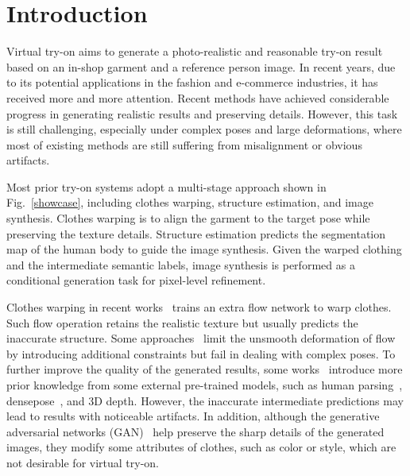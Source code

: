 \documentclass[runningheads]{llncs}
\begin{document}
\section{Introduction}

Virtual try-on aims to generate a photo-realistic and reasonable try-on result based on an in-shop garment and a reference person image. In recent years, due to its potential applications in the fashion and e-commerce industries, it has received more and more attention. Recent methods \cite{ge2021parser,AGCPN,vitonhd,ge2021disentangled,zflow} have achieved considerable progress in generating realistic results and preserving details. However, this task is still challenging, especially under complex poses and large deformations, where most of existing methods are still suffering from misalignment or obvious artifacts.

\begin{figure}[t]
\end{figure}

Most prior try-on systems adopt a multi-stage approach \cite{han2018viton,CPVTON,AGCPN,ge2021disentangled} shown in Fig.~\ref{showcase}, including clothes warping, structure estimation, and image synthesis. Clothes warping is to align the garment to the target pose while preserving the texture details. Structure estimation predicts the segmentation map of the human body to guide the image synthesis. Given the warped clothing and the intermediate semantic labels, image synthesis is performed as a conditional generation task for pixel-level refinement. 

Clothes warping in recent works~\cite{han2019clothflow,AGCPN,ge2021parser,zflow} trains an extra flow network to warp clothes. Such flow operation retains the realistic texture but usually predicts the inaccurate structure. Some approaches~\cite{han2019clothflow,ge2021parser} limit the unsmooth deformation of flow by introducing additional constraints but fail in dealing with complex poses. To further improve the quality of the generated results, some works~\cite{AGCPN,zflow} introduce more prior knowledge from some external pre-trained models, such as human parsing~\cite{gong2017LIP}, densepose~\cite{guler2018densepose}, and 3D depth. However, the inaccurate intermediate predictions may lead to results with noticeable artifacts. In addition, although the generative adversarial networks (GAN)~\cite{gan} help preserve the sharp details of the generated images, they modify some attributes of clothes, such as color or style, which are not desirable for virtual try-on.
\end{document}
